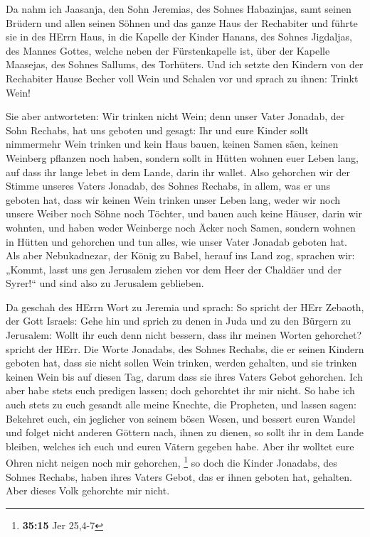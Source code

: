  Da nahm ich Jaasanja, den Sohn Jeremias, des Sohnes
Habazinjas, samt seinen Brüdern und allen seinen Söhnen und das ganze
Haus der Rechabiter  und führte sie in des HErrn Haus, in
die Kapelle der Kinder Hanans, des Sohnes Jigdaljas, des Mannes Gottes,
welche neben der Fürstenkapelle ist, über der Kapelle Maasejas, des
Sohnes Sallums, des Torhüters.  Und ich setzte den Kindern
von der Rechabiter Hause Becher voll Wein und Schalen vor und sprach zu
ihnen: Trinkt Wein!

 Sie aber antworteten: Wir trinken nicht Wein; denn unser
Vater Jonadab, der Sohn Rechabs, hat uns geboten und gesagt: Ihr und
eure Kinder sollt nimmermehr Wein trinken  und kein Haus
bauen, keinen Samen säen, keinen Weinberg pflanzen noch haben, sondern
sollt in Hütten wohnen euer Leben lang, auf dass ihr lange lebet in dem
Lande, darin ihr wallet.  Also gehorchen wir der Stimme
unseres Vaters Jonadab, des Sohnes Rechabs, in allem, was er uns geboten
hat, dass wir keinen Wein trinken unser Leben lang, weder wir noch
unsere Weiber noch Söhne noch Töchter,  und bauen auch keine
Häuser, darin wir wohnten, und haben weder Weinberge noch Äcker noch
Samen,  sondern wohnen in Hütten und gehorchen und tun
alles, wie unser Vater Jonadab geboten hat.  Als aber
Nebukadnezar, der König zu Babel, herauf ins Land zog, sprachen wir:
„Kommt, lasst uns gen Jerusalem ziehen vor dem Heer der Chaldäer und der
Syrer!{}`` und sind also zu Jerusalem geblieben.

 Da geschah des HErrn Wort zu Jeremia und sprach:
 So spricht der HErr Zebaoth, der Gott Israels: Gehe hin
und sprich zu denen in Juda und zu den Bürgern zu Jerusalem: Wollt ihr
euch denn nicht bessern, dass ihr meinen Worten gehorchet? spricht der
HErr.  Die Worte Jonadabs, des Sohnes Rechabs, die er
seinen Kindern geboten hat, dass sie nicht sollen Wein trinken, werden
gehalten, und sie trinken keinen Wein bis auf diesen Tag, darum dass sie
ihres Vaters Gebot gehorchen. Ich aber habe stets euch predigen lassen;
doch gehorchtet ihr mir nicht.  So habe ich auch stets zu
euch gesandt alle meine Knechte, die Propheten, und lassen sagen:
Bekehret euch, ein jeglicher von seinem bösen Wesen, und bessert euren
Wandel und folget nicht anderen Göttern nach, ihnen zu dienen, so sollt
ihr in dem Lande bleiben, welches ich euch und euren Vätern gegeben
habe. Aber ihr wolltet eure Ohren nicht neigen noch mir gehorchen,
\footnote{\textbf{35:15} Jer 25,4-7}  so doch die Kinder
Jonadabs, des Sohnes Rechabs, haben ihres Vaters Gebot, das er ihnen
geboten hat, gehalten. Aber dieses Volk gehorchte mir nicht.

